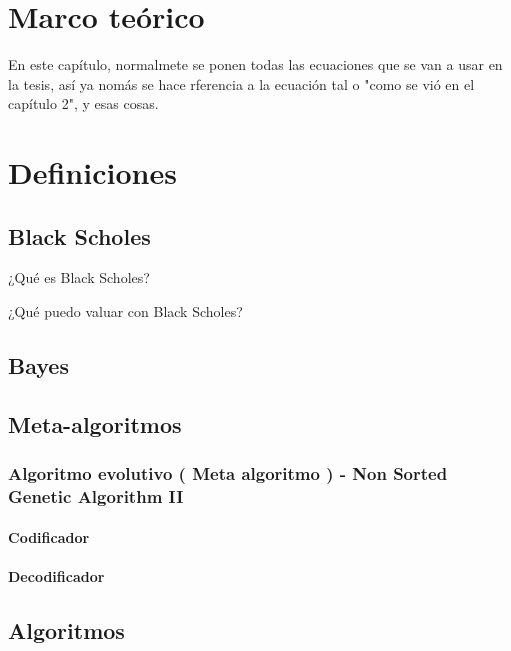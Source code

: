

\chapter{Marco teórico}

En este capítulo, normalmete se ponen todas las ecuaciones que se van a usar en la tesis, así ya nomás se hace rferencia a la ecuación tal o "como se vió en el capítulo 2", y esas cosas. 

\chapter{Definiciones}

    \section{Black Scholes}

    ¿Qué es Black Scholes?

    ¿Qué puedo valuar con Black Scholes?
    
    \section{Bayes}

    \section{Meta-algoritmos}
    
        \subsection{Algoritmo evolutivo ( Meta algoritmo ) - Non Sorted Genetic Algorithm II}
        
            \subsubsection{Codificador}
            
            \subsubsection{Decodificador}
    
    \section{Algoritmos}
    
